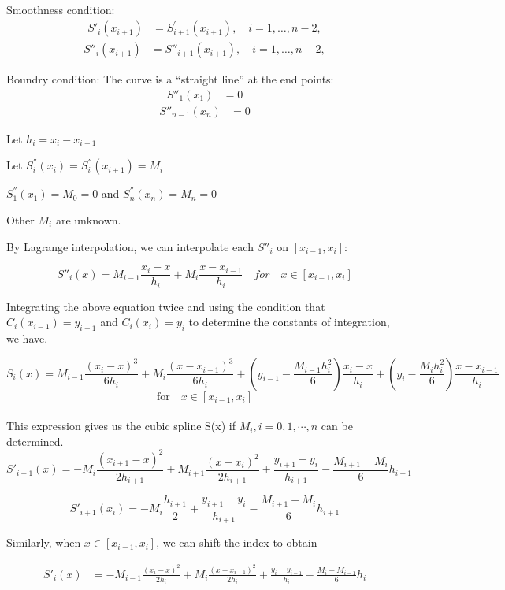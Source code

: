 \documentclass{article}
\begin{document}
Smoothness condition:
\begin{align}
S'_i(x_{i+1}) &= S^{\prime}_{i+1}(x_{i+1}),\quad i = 1,\ldots,n-2,
\end{align}
\begin{align}
S''_i(x_{i+1}) &= S''_{i+1}(x_{i+1}),\quad i = 1,\ldots,n-2,
\end{align}

Boundry condition: The curve is a “straight line” at the end points:
\begin{align}
S''_1(x_1) &= 0
\end{align}
\begin{align}
S''_{n-1}(x_n) &= 0
\end{align}

Let $h_{i}=x_{i}-x_{i-1}$

Let $S_i^{''}(x_i) = S_i^{''}(x_{i+1}) = M_i$

$S_1^{''}(x_1)= M_0 = 0$ and $S_n^{''}(x_n) = M_n = 0$

Other $M_i$ are unknown.

By Lagrange interpolation, we can interpolate each $S''_{i}$ on  $[x_{i-1},x_{i}]$:

$$S''_{i}(x)=M_{i-1}{\frac {x_{i}-x}{h_{i}}}+M_{i}{\frac {x-x_{i-1}}{h_{i}}} \quad for \quad x\in [x_{i-1},x_{i}]$$

Integrating the above equation twice and using the condition that $C_{i}(x_{i-1})=y_{i-1}$ and $ C_{i}(x_{i})=y_{i}$ to determine the constants of integration, we have.

$$ S_{i}(x)=M_{i-1}{\frac {(x_{i}-x)^{3}}{6h_{i}}}+M_{i}{\frac {(x-x_{i-1})^{3}}{6h_{i}}}+\left(y_{i-1}-{\frac {M_{i-1}h_{i}^{2}}{6}}\right){\frac {x_{i}-x}{h_{i}}}+\left(y_{i}-{\frac {M_{i}h_{i}^{2}}{6}}\right){\frac {x-x_{i-1}}{h_{i}}}$$
$${\text{for}}\quad x\in [x_{i-1},x_{i}] $$\\

This expression gives us the cubic spline S(x) if $ M_{i},i=0,1,\cdots ,n$ can be determined.
$$S'_{i+1}(x)=-M_{i}{\frac {(x_{i+1}-x)^{2}}{2h_{i+1}}}+M_{i+1}{\frac {(x-x_{i})^{2}}{2h_{i+1}}}+{\frac {y_{i+1}-y_{i}}{h_{i+1}}}-{\frac {M_{i+1}-M_{i}}{6}}h_{i+1}$$

$$S'_{i+1}(x_{i})=-M_{i}{\frac {h_{i+1}}{2}}+{\frac {y_{i+1}-y_{i}}{h_{i+1}}}-{\frac {M_{i+1}-M_{i}}{6}}h_{i+1}$$

Similarly, when $x\in [x_{i-1},x_{i}]$, we can shift the index to obtain

\begin{align}
S'_{i}(x) &=-M_{i-1}{\frac {(x_{i}-x)^{2}}{2h_{i}}}+M_{i}{\frac {(x-x_{i-1})^{2}}{2h_{i}}}+{\frac {y_{i}-y_{i-1}}{h_{i}}}-{\frac {M_{i}-M_{i-1}}{6}}h_{i}
\end{align}
\end{document}
